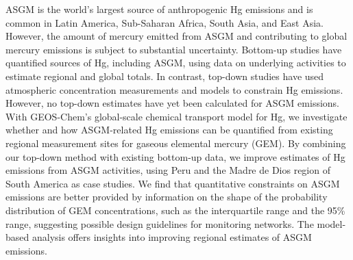 % 
% 
%
\begin{flushleft}
    ASGM is the world's largest source of anthropogenic Hg emissions and is common in Latin America, Sub-Saharan Africa, South Asia, and East Asia. However, the amount of mercury emitted from ASGM and contributing to global mercury emissions is subject to substantial uncertainty. Bottom-up studies have quantified sources of Hg, including ASGM, using data on underlying activities to estimate regional and global totals. In contrast, top-down studies have used atmospheric concentration measurements and models to constrain Hg emissions. However, no top-down estimates have yet been calculated for ASGM emissions. With GEOS-Chem's global-scale chemical transport model for Hg, we investigate whether and how ASGM-related Hg emissions can be quantified from existing regional measurement sites for gaseous elemental mercury (GEM). By combining our top-down method with existing bottom-up data, we improve estimates of Hg emissions from ASGM activities, using Peru and the Madre de Dios region of South America as case studies. We find that quantitative constraints on ASGM emissions are better provided by information on the shape of the probability distribution of GEM concentrations, such as the interquartile range and the 95\% range, suggesting possible design guidelines for monitoring networks. The model-based analysis offers insights into improving regional estimates of ASGM emissions. 
\end{flushleft}
